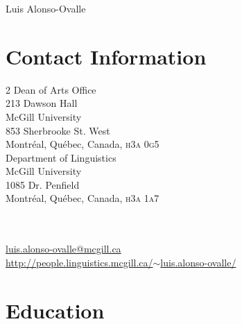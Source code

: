 \documentclass[11pt]{article}
\begin{document}
\markright{}
\thispagestyle{plain}
\author{}
\vspace{-2cm}
\begin{center}
{\LARGE Luis Alonso-Ovalle}
\end{center}

\vspace{.4cm}


\section*{Contact Information}
\begin{multicols}{2}
Dean of Arts Office\\
213 Dawson Hall\\
McGill University \\
853 Sherbrooke St. West \\
Montr\'eal, Qu\'ebec, Canada, \textsc{h3a 0g5}\\

Department of Linguistics\\
McGill University \\
1085 Dr. Penfield \\
Montr\'eal, Qu\'ebec, Canada, \textsc{h3a 1a7}\\
\\
\\
\end{multicols}
\vspace{-36pt}
\Letter \hspace{3pt}  \href{mailto:luis.alonso-ovalle@mcgill.ca}{luis.alonso-ovalle@mcgill.ca}\\
\ComputerMouse \hspace{6pt}
\href{http://people.linguistics.mcgill.ca/~luis.alonso-ovalle/}{http://people.linguistics.mcgill.ca/$\sim$luis.alonso-ovalle/}



\section*{Education}
\end{document}
